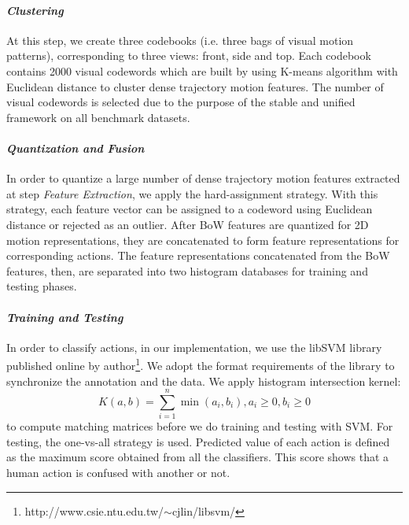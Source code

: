 \documentclass[final,3p,times,twocolumn]{elsarticle}
\begin{document}
\paragraph{\bf \textit{Clustering}}
At this step, we create three codebooks (i.e. three bags of visual motion patterns), corresponding to three views: front, side and top.
Each codebook contains 2000 visual codewords which are built by using K-means algorithm with Euclidean distance to cluster dense trajectory motion features.
The number of visual codewords is selected due to the purpose of the stable and unified framework on all benchmark datasets.

\paragraph{\bf \textit{Quantization and Fusion}}
In order to quantize a large number of dense trajectory motion features extracted at step {\it Feature Extraction}, we apply the hard-assignment strategy.
With this strategy, each feature vector can be assigned to a codeword using Euclidean distance or rejected as an outlier.
After BoW features are quantized for 2D motion representations, they are concatenated to form feature representations for corresponding actions.
The feature representations concatenated from the BoW features, then, are separated into two histogram databases for training and testing phases.

\paragraph{\bf \textit{Training and Testing}}
In order to classify actions, in our implementation, we use the libSVM library \cite{chang2011libsvm} published online by author\footnote{http://www.csie.ntu.edu.tw/$\sim$cjlin/libsvm/}.
We adopt the format requirements of the library to synchronize the annotation and the data.
We apply histogram intersection kernel:
\begin{equation}
K(a,b) = \sum_{i=1}^{n}\min(a_i,b_i), a_i \geq 0, b_i \geq 0
\end{equation}
to compute matching matrices before we do training and testing with SVM.
For testing, the one-vs-all strategy is used.
Predicted value of each action is defined as the maximum score obtained from all the classifiers.
This score shows that a human action is confused with another or not.
\end{document}
